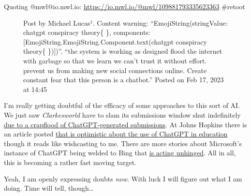 Quoting @mwl@io.mwl.io: \url{https://io.mwl.io/@mwl/109881793335623363}
\#retoot

\begin{figure}
\centering
{}
\caption{Post by Michael Lucas¹. Content warning:
``EmojiString(stringValue: chatgpt conspiracy theory\{ \}, components:
{[}EmojiString.EmojiString.Component.text(chatgpt conspiracy theory\{
\}){]})''. ``the system is working as designed flood the internet with
garbage so that we learn we can't trust it without effort. prevent us
from making new social connections online. Create constant fear that
this person is a chatbot.'' Posted on Feb 17, 2023 at 14:45}
\end{figure}

I'm really getting doubtful of the efficacy of some approaches to this
sort of AI. We just saw \emph{Clarkesworld} have to slam its submissions
window shut indefinitely
\href{http://web.archive.org/web/20230222022224/https://arstechnica.com/information-technology/2023/02/sci-fi-becomes-real-as-renowned-magazine-closes-submissions-due-to-ai-writers/}{due
to a crapflood of ChatGPT-generated submissions}. At Johns Hopkins there
is an article posted
\href{http://web.archive.org/web/20230222055340/https://hub.jhu.edu/2023/02/20/chatgpt-in-higher-education-discussion/}{that
is optimistic about the use of ChatGPT in education} though it reads
like wishcasting to me. There are more stories about Microsoft's
instance of ChatGPT being welded to Bing that
\href{https://www.msn.com/en-gb/money/technology/microsoft-sets-new-limits-on-bing-chatgpt-to-prevent-unhinged-behavior/ar-AA17M0Nu}{is
acting unhinged}. All in all, this is becoming a rather fast moving
target.

Yeah, I am openly expressing doubts \emph{now}. With luck I will figure
out what I am doing. Time will tell, though\ldots{}
